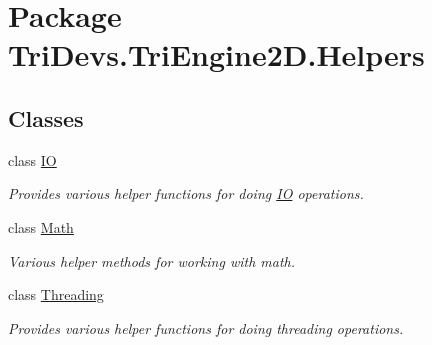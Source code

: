 \hypertarget{namespace_tri_devs_1_1_tri_engine2_d_1_1_helpers}{\section{Package Tri\-Devs.\-Tri\-Engine2\-D.\-Helpers}
\label{namespace_tri_devs_1_1_tri_engine2_d_1_1_helpers}
}
\subsection*{Classes}
\begin{DoxyCompactItemize}
\item 
class \hyperlink{class_tri_devs_1_1_tri_engine2_d_1_1_helpers_1_1_i_o}{I\-O}
\begin{DoxyCompactList}\small\item\em Provides various helper functions for doing \hyperlink{class_tri_devs_1_1_tri_engine2_d_1_1_helpers_1_1_i_o}{I\-O} operations. \end{DoxyCompactList}\item 
class \hyperlink{class_tri_devs_1_1_tri_engine2_d_1_1_helpers_1_1_math}{Math}
\begin{DoxyCompactList}\small\item\em Various helper methods for working with math. \end{DoxyCompactList}\item 
class \hyperlink{class_tri_devs_1_1_tri_engine2_d_1_1_helpers_1_1_threading}{Threading}
\begin{DoxyCompactList}\small\item\em Provides various helper functions for doing threading operations. \end{DoxyCompactList}\end{DoxyCompactItemize}
